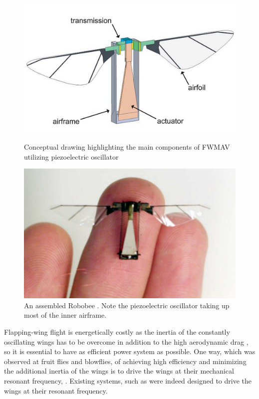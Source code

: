 \begin{figure}
\centering
{}
\includegraphics[width=\textwidth]{Files/Figures/robobee_example_1.png}
\caption[Piezo-oscillator conceptual drawing]{Conceptual drawing highlighting the main components of FWMAV utilizing piezoelectric oscillator \cite{Wood2005}}
\label{fig:robobee_example_1}
\endminipage\hfill
{}
\includegraphics[width=\textwidth]{Files/Figures/robobee_example_2.png}
\caption[Piezo-oscillator in practice]{An assembled Robobee \cite{Wood2005}. Note the piezoelectric oscillator taking up most of the inner airframe.}
\label{fig:robobee_example_2}
\endminipage\hfill
\end{figure}

Flapping-wing flight is energetically costly \cite{Buck2013} as the inertia of the constantly oscillating wings has to be overcome in addition to the high aerodynamic drag \cite{Hines2015}, so it is essential to have as efficient power system as possible. One way, which was observed at fruit flies and blowflies, of achieving high efficiency and minimizing the additional inertia of the wings is to drive the wings at their mechanical resonant frequency, \cite{Hines2015}. Existing systems, such as \cite{Wood2008} were indeed designed to drive the wings at their resonant frequency.

